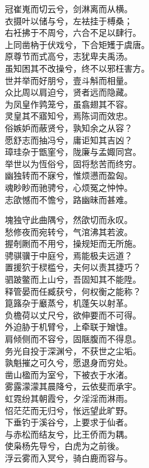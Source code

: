 \documentclass[]{article}
\begin{document}
冠崔嵬而切云兮，剑淋离而从横。\\
衣摄叶以储与兮，左袪挂于榑桑；\\
右衽拂于不周兮，六合不足以肆行。\\
上同凿枘于伏戏兮，下合矩矱于虞唐。\\
原尊节而式高兮，志犹卑夫禹汤。\\
虽知困其不改操兮，终不以邪枉害方。\\
世并举而好朋兮，壹斗斛而相量。\\
众比周以肩迫兮，贤者远而隐藏。\\
为凤皇作鹑笼兮，虽翕翅其不容。\\
灵皇其不寤知兮，焉陈词而效忠。\\
俗嫉妒而蔽贤兮，孰知余之从容？\\
愿舒志而抽冯兮，庸讵知其吉凶？\\
璋珪杂于甑窐兮，陇廉与孟娵同宫。\\
举世以为恆俗兮，固将愁苦而终穷。\\
幽独转而不寐兮，惟烦懑而盈匈。\\
魂眇眇而驰骋兮，心烦冤之忡忡。\\
志欿憾而不憺兮，路幽昧而甚难。

塊独守此曲隅兮，然欿切而永叹。\\
愁修夜而宛转兮，气涫沸其若波。\\
握剞劂而不用兮，操规矩而无所施。\\
骋骐骥于中庭兮，焉能极夫远道？\\
置援狖于棂槛兮，夫何以责其捷巧？\\
驷跛鳖而上山兮，吾固知其不能陞。\\
释管晏而任臧获兮，何权衡之能称？\\
箟簬杂于黀蒸兮，机蓬矢以射革。\\
负檐荷以丈尺兮，欲伸要而不可得。\\
外迫胁于机臂兮，上牵联于矰隿。\\
肩倾侧而不容兮，固陿腹而不得息。\\
务光自投于深渊兮，不获世之尘垢。\\
孰魁摧之可久兮，愿退身而穷处。\\
凿山楹而为室兮，下被衣于水渚。\\
雾露濛濛其晨降兮，云依斐而承宇。\\
虹霓纷其朝霞兮，夕淫淫而淋雨。\\
怊茫茫而无归兮，怅远望此旷野。\\
下垂钓于溪谷兮，上要求于仙者。\\
与赤松而结友兮，比王侨而为耦。\\
使枭杨先导兮，白虎为之前後。\\
浮云雾而入冥兮，骑白鹿而容与。
\end{document}
